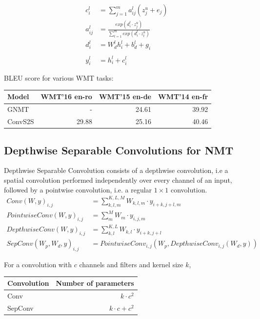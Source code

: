 \documentclass[a4paper]{article}
\begin{document}
\begin{align*}
  c_i^l &= \sum_{j = 1}^{m}{a_{ij}^l(z_j^u + e_j)} \\
  a_{ij}^l &= \frac{exp(d_i^l \cdot z_j^u)}
  {\sum_{t = 1}^{m}{exp(d_i^l \cdot z_t^u)}} \\
  d_i^l &= W_d^l h_i^l + b_d^l + g_i \\
  \\
  y_i^l &= h_i^l + c_i^l
\end{align*}


BLEU score for various WMT tasks:
\begin{center}
  \begin{tabular}{lrrr}
  \hline
    Model & WMT'16 en-ro & WMT'15 en-de & WMT'14 en-fr \\
  \hline
    GNMT & - & 24.61 & 39.92 \\
    ConvS2S & 29.88 & 25.16 & 40.46 \\
  \hline
  \end{tabular}
\end{center}


\subsection{Depthwise Separable Convolutions for NMT}


Depthwise Separable Convolution consists of a depthwise convolution, i.e a
spatial convolution performed independently over every channel of an input,
followed by a pointwise convolution, i.e. a regular $1 \times 1$ convolution.
\begin{align*}
  Conv(W, y)_{i,j} &= \sum_{k,l,m}^{K,L,M}{W_{k,l,m} \cdot y_{i+k,j+l,m}}
  \\
  PointwiseConv(W, y)_{i,j} &= \sum_{m}^{M}{W_m \cdot y_{i,j,m}} \\
  DepthwiseConv(W, y)_{i,j} &= \sum_{k,l}^{K,L}{W_{k,l} \cdot y_{i+k,j+l}} \\
  SepConv(W_p, W_d, y)_{i,j} &=
    PointwiseConv_{i,j}(W_p, DepthwiseConv_{i,j}(W_d, y))
\end{align*}


For a convolution with $c$ channels and filters and kernel size $k$,
\begin{center}
  \begin{tabular}{lr}
  \hline
    Convolution & Number of parameters\\
  \hline
    Conv & $k \cdot c^2$ \\
    SepConv & $k \cdot c + c^2$ \\
  \hline
  \end{tabular}
\end{center}
\end{document}
